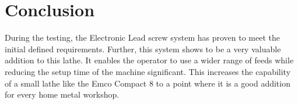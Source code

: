 \section{Conclusion}
During the testing, the Electronic Lead screw system has proven to meet the initial defined requirements. Further, this system shows to be a very valuable addition to this lathe. It enables the operator to use a wider range of feeds while reducing the setup time of the machine significant. This increases the capability of a small lathe like the Emco Compact 8 to a point where it is a good addition for every home metal workshop.
 
 

